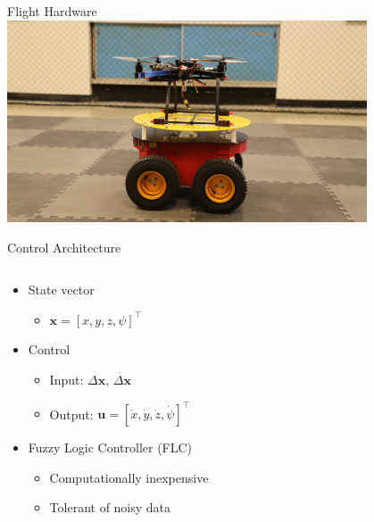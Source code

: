 \documentclass[]{beamer}
\begin{document}
\begin{frame}{Flight Hardware}
    \centering
    \includegraphics[width=0.8\textwidth]{../images/irols.png}
\end{frame}

\begin{frame}{Control Architecture}
    \begin{columns}
        \begin{column}{0.45\textwidth}
            \begin{itemize}
                \item State vector
                    \begin{itemize}
                        \item $\bm{x} = \left[x,y,z,\psi\right]^\top$
                    \end{itemize}
                \item Control
                    \begin{itemize}
                        \item Input: $\Delta\bm{x},\,\dot{\Delta\bm{x}}$
                        \item Output: $\bm{u}=\left[\dot{x},\dot{y},\dot{z},\dot{\psi}\right]^\top$
                    \end{itemize}
                \item Fuzzy Logic Controller (FLC)
                    \begin{itemize}
                        \item Computationally inexpensive
                        \item Tolerant of noisy data
                    \end{itemize}
            \end{itemize}
        \end{column}
        \begin{column}{0.55\textwidth}
            
        \end{column}
    \end{columns}
\end{frame}
            
\end{document}
